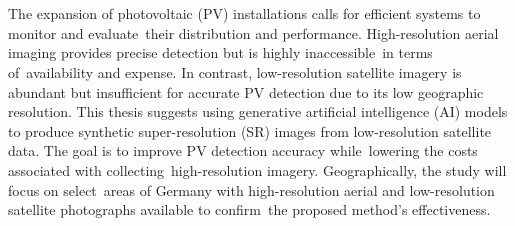 \chapter{\abstractname}


The expansion of photovoltaic (PV) installations calls for efficient systems to monitor and evaluate their distribution and performance. High-resolution aerial imaging provides precise detection but is highly inaccessible in terms of availability and expense. In contrast, low-resolution satellite imagery is abundant but insufficient for accurate PV detection due to its low geographic resolution. This thesis suggests using generative artificial intelligence (AI) models to produce synthetic super-resolution (SR) images from low-resolution satellite data. The goal is to improve PV detection accuracy while lowering the costs associated with collecting high-resolution imagery. Geographically, the study will focus on select areas of Germany with high-resolution aerial and low-resolution satellite photographs available to confirm the proposed method's effectiveness.